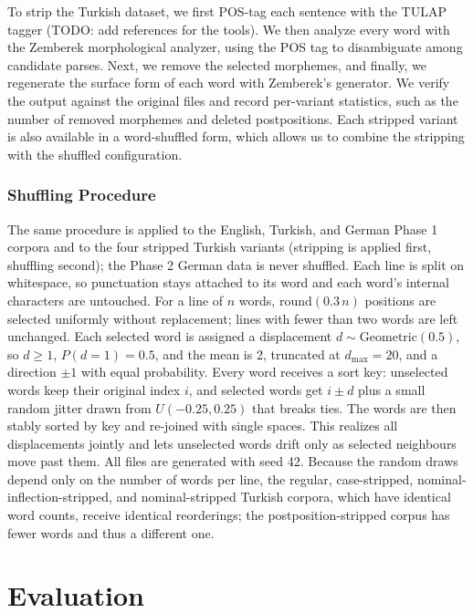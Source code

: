 \documentclass[11pt]{article}
\begin{document}
To strip the Turkish dataset, we first POS-tag each sentence with the TULAP tagger (TODO: add references for the tools). We then analyze every word with the Zemberek morphological analyzer, using the POS tag to disambiguate among candidate parses. Next, we remove the selected morphemes, and finally, we regenerate the surface form of each word with Zemberek's generator. We verify the output against the original files and record per-variant statistics, such as the number of removed morphemes and deleted postpositions. Each stripped variant is also available in a word-shuffled form, which allows us to combine the stripping with the shuffled configuration.

\subsubsection{Shuffling Procedure}
\label{sec:shuffle}

The same procedure is applied to the English, Turkish, and German Phase 1 corpora and to the four stripped Turkish variants (stripping is applied first, shuffling second); the Phase 2 German data is never shuffled. Each line is split on whitespace, so punctuation stays attached to its word and each word's internal characters are untouched. For a line of $n$ words, $\mathrm{round}(0.3\,n)$ positions are selected uniformly without replacement; lines with fewer than two words are left unchanged. Each selected word is assigned a displacement $d \sim \mathrm{Geometric}(0.5)$, so $d \ge 1$, $P(d=1)=0.5$, and the mean is 2, truncated at $d_{\max}=20$, and a direction $\pm 1$ with equal probability. Every word receives a sort key: unselected words keep their original index $i$, and selected words get $i \pm d$ plus a small random jitter drawn from $U(-0.25, 0.25)$ that breaks ties. The words are then stably sorted by key and re-joined with single spaces. This realizes all displacements jointly and lets unselected words drift only as selected neighbours move past them. All files are generated with seed 42. Because the random draws depend only on the number of words per line, the regular, case-stripped, nominal-inflection-stripped, and nominal-stripped Turkish corpora, which have identical word counts, receive identical reorderings; the postposition-stripped corpus has fewer words and thus a different one.

\section{Evaluation}
\end{document}
